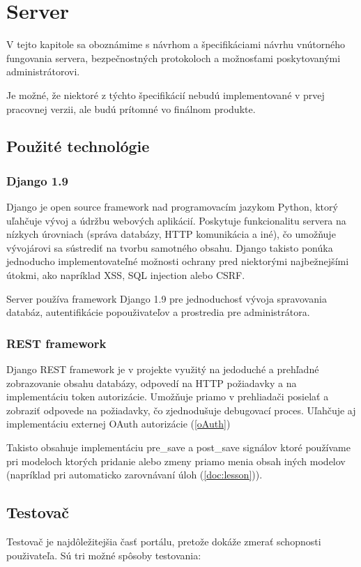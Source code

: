 \chapter{Server}

\label{kap:server}

V tejto kapitole sa oboznámime s návrhom a špecifikáciami návrhu vnútorného fungovania servera,
bezpečnostných protokoloch a možnosťami poskytovanými administrátorovi.

Je možné, že niektoré z týchto špecifikácií nebudú implementované v prvej pracovnej verzii,
ale budú prítomné vo finálnom produkte.

\section{Použité technológie}

\subsection{Django 1.9}
Django je open source framework nad programovacím jazykom Python, ktorý uľahčuje vývoj a údržbu webových aplikácií.
Poskytuje funkcionalitu servera na nízkych úrovniach (správa databázy, HTTP komunikácia a iné), čo umožňuje vývojárovi sa sústrediť na tvorbu samotného obsahu.
Django takisto ponúka jednoducho implementovateľné možnosti ochrany pred niektorými najbežnejšími útokmi, ako napríklad XSS, SQL injection alebo CSRF.

Server používa framework Django 1.9 pre jednoduchosť vývoja spravovania databáz, autentifikácie popouživateľov a prostredia pre administrátora.
\subsection{REST framework}
Django REST framework je v projekte využitý na jedoduché a prehľadné zobrazovanie obsahu databázy, odpovedí na HTTP požiadavky a na implementáciu
token autorizácie. Umožňuje priamo v prehliadači posielať a zobraziť odpovede na požiadavky, čo zjednodušuje debugovací proces. Uľahčuje aj implementáciu externej OAuth
autorizácie (\ref{oAuth})

Takisto obsahuje implementáciu pre\_save a post\_save signálov ktoré používame pri
modeloch ktorých pridanie alebo zmeny priamo menia obsah iných modelov
(napríklad pri automaticko zarovnávaní úloh (\ref{doc:lesson})).
\section{Testovač}
\label{testovace}
Testovač je najdôležitejšia časť portálu, pretože dokáže zmerať schopnosti použivateľa. Sú tri možné spôsoby testovania:
